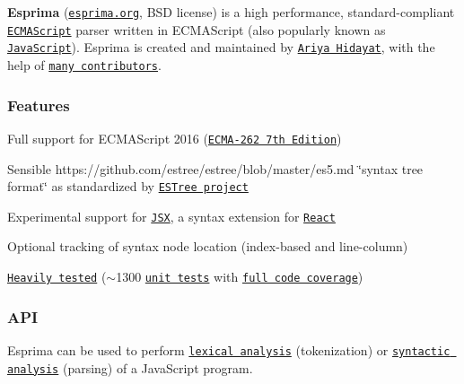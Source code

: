 \href{https://www.npmjs.com/package/esprima}{\tt } \href{https://www.npmjs.com/package/esprima}{\tt } \href{https://travis-ci.org/jquery/esprima}{\tt } \href{https://codecov.io/github/jquery/esprima}{\tt }

{\bfseries Esprima} (\href{http://esprima.org}{\tt esprima.\+org}, B\+SD license) is a high performance, standard-\/compliant \href{http://www.ecma-international.org/publications/standards/Ecma-262.htm}{\tt E\+C\+M\+A\+Script} parser written in E\+C\+M\+A\+Script (also popularly known as \href{https://en.wikipedia.org/wiki/JavaScript}{\tt Java\+Script}). Esprima is created and maintained by \href{https://twitter.com/ariyahidayat}{\tt Ariya Hidayat}, with the help of \href{https://github.com/jquery/esprima/contributors}{\tt many contributors}.

\subsubsection*{Features}


\begin{DoxyItemize}
\item Full support for E\+C\+M\+A\+Script 2016 (\href{http://www.ecma-international.org/publications/standards/Ecma-262.htm}{\tt E\+C\+M\+A-\/262 7th Edition})
\item Sensible https\+://github.com/estree/estree/blob/master/es5.\+md \char`\"{}syntax tree format\char`\"{} as standardized by \href{https://github.com/estree/estree}{\tt E\+S\+Tree project}
\item Experimental support for \href{https://facebook.github.io/jsx/}{\tt J\+SX}, a syntax extension for \href{https://facebook.github.io/react/}{\tt React}
\item Optional tracking of syntax node location (index-\/based and line-\/column)
\item \href{http://esprima.org/test/ci.html}{\tt Heavily tested} ($\sim$1300 \href{https://github.com/jquery/esprima/tree/master/test/fixtures}{\tt unit tests} with \href{https://codecov.io/github/jquery/esprima}{\tt full code coverage})
\end{DoxyItemize}

\subsubsection*{A\+PI}

Esprima can be used to perform \href{https://en.wikipedia.org/wiki/Lexical_analysis}{\tt lexical analysis} (tokenization) or \href{https://en.wikipedia.org/wiki/Parsing}{\tt syntactic analysis} (parsing) of a Java\+Script program.

